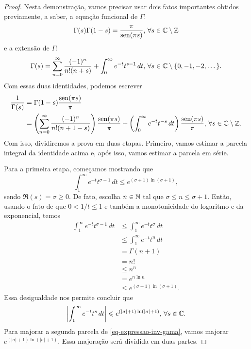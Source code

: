     \begin{proof}
        Nesta demonstração, vamos precisar usar dois fatos importantes obtidos previamente,
        a saber, a equação funcional de $\Gamma$:
        \[
        \Gamma(s)\Gamma(1-s) = \frac{\pi}{\operatorname{sen}(\pi s)}, \, \forall s\in\mathbb{C}\setminus\mathbb{Z}
        \]
        e a extensão de $\Gamma$:
        \[
        \Gamma(s) = \sum_{n=0}^{\infty} \frac{(-1)^n}{n!(n+s)} 
                    + \int_0^{\infty} e^{-t}t^{s-1} \, dt, \, 
                    \forall s\in\mathbb{C}\setminus\{0, -1, -2, \dots\}.
        \]
        Com essas duas identidades, podemos escrever
        \begin{align}
        \label{eq-expressao-inv-gama}
            \frac{1}{\Gamma(s)} &= \Gamma(1-s)\frac{\operatorname{sen}(\pi s)}{\pi} \nonumber \\ 
                                &= \left( \sum_{n=0}^{\infty} \frac{(-1)^n}{n!(n+1-s)} \right)
                                \frac{\operatorname{sen}(\pi s)}{\pi}
                                + \left( \int_0^{\infty} e^{-t}t^{-s} \, dt \right)
                                \frac{\operatorname{sen}(\pi s)}{\pi}, \, \forall s\in\mathbb{C}\setminus\mathbb{Z}.
        \end{align}
        Com isso, dividiremos a prova em duas etapas. Primeiro, vamos estimar a parcela integral
        da identidade acima e, após isso, vamos estimar a parcela em série.
        
        Para a primeira etapa, começamos mostrando que
        \begin{equation}
        \label{eq-cota-int-parte-real}
            \int_1^{\infty} e^{-t} t^{\sigma - 1} \, dt \leq e^{(\sigma + 1)\ln(\sigma + 1)},
        \end{equation}
        sendo $\Re(s) = \sigma \geq 0$. De fato, escolha $n\in\mathbb{N}$ tal que 
        $\sigma \leq n\leq \sigma+1$. Então, usando o fato de que $0< 1/t \leq 1$ e também
        a monotonicidade do logaritmo e da exponencial, temos
        \begin{align*}
            \int_1^{\infty} e^{-t}t^{\sigma - 1} \, dt 
            &\leq \int_1^{\infty} e^{-t}t^{\sigma} \, dt \\
            &\leq \int_1^{\infty} e^{-t} t^n \, dt \\
            &= \Gamma(n+1) \\
            &= n! \\
            &\leq n^n \\
            &= e^{n\ln n} \\
            &\leq e^{(\sigma + 1)\ln(\sigma + 1)}.
        \end{align*}
        Essa desigualdade nos permite concluir que
        \[
        \left| \int_1^{\infty} e^{-t} t^s \, dt \right| \leqslant e^{(|\sigma|+1)\ln(|\sigma|+1)}, \, 
        \forall s\in\mathbb{C}.
        \]
        Para majorar a segunda parcela de \eqref{eq-expressao-inv-gama}, vamos majorar
        $e^{(|\sigma|+1)\ln(|\sigma|+1)}$. Essa majoração será dividida em duas partes.
        

\end{proof}
